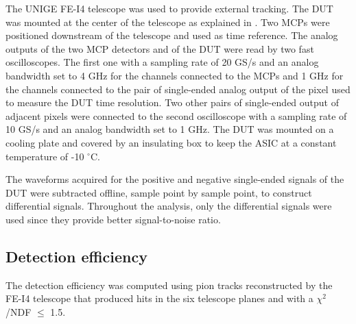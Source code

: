 		The UNIGE FE-I4 telescope \cite{telescope} was used to provide external tracking. The DUT was mounted at the center of the telescope as explained in \cite{Monolith_20ps}.
		Two MCPs were positioned downstream of the telescope and used as time reference.
		The analog outputs of the two MCP detectors and of the DUT were read by two fast oscilloscopes. The first one with a sampling rate of 20 GS/s and an analog bandwidth set to 4 GHz for the channels connected to the MCPs and 1 GHz for the channels connected to the pair of single-ended analog output of the pixel used to measure the DUT time resolution. Two other pairs of single-ended output of adjacent pixels were connected to the second oscilloscope with a sampling rate of 10 GS/s and an analog bandwidth set to 1 GHz.
		The DUT was mounted on a cooling plate and covered by an insulating box to keep the ASIC at a constant temperature of -10 $^\circ$C. 

		The waveforms acquired for the positive and negative single-ended signals of the DUT were subtracted offline, sample point by sample point, to construct differential signals. Throughout the analysis, only the differential signals were used since they provide better signal-to-noise ratio. 


		\subsection{Detection efficiency}
		The detection efficiency was computed using pion tracks reconstructed by the FE-I4 telescope that produced hits in the six telescope planes and with a $\chi^2$/NDF $\le$ 1.5.

